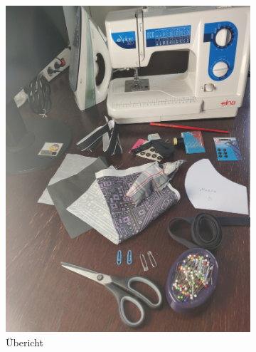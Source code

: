 \documentclass[12pt,parskip=full]{scrartcl}
\begin{document}
\begin{figure}[h]
    \vspace{0.5cm}
    \centering
    \begin{subfigure}{0.48\textwidth}
        \centering
        \includegraphics[width = \linewidth]{Pictures/01_Materials/materials_01_resized.jpg}
        \caption{Übericht}
    \end{subfigure}
    \begin{subfigure}{0.48\textwidth}
        \centering

\end{subfigure}
\end{figure}
\end{document}
